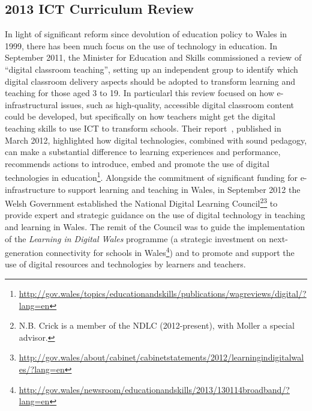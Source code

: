 \documentclass{sig-alternate}
\begin{document}
%

\subsection{2013 ICT Curriculum Review}


In light of significant reform since devolution of education policy to
Wales in 1999, there has been much focus on the use of technology in
education. In September 2011, the Minister for Education and Skills
commissioned a review of ``digital classroom teaching'', setting up an
independent group to identify which digital classroom delivery aspects
should be adopted to transform learning and teaching for those aged 3
to 19. In particularl this review focused on how e-infrastructural
issues, such as high-quality, accessible digital classroom content
could be developed, but specifically on how teachers might get the
digital teaching skills to use ICT to transform schools. Their
report~\cite{haywarddigwales:2012}, published in March 2012,
highlighted how digital technologies, combined with sound pedagogy,
can make a substantial difference to learning experiences and
performance, recommends actions to introduce, embed and promote the
use of digital technologies in
education\footnote{\url{http://gov.wales/topics/educationandskills/publications/wagreviews/digital/?lang=en}}. Alongside
the commitment of significant funding for e-infrastructure to support
learning and teaching in Wales, in September 2012 the Welsh Government
established the National Digital Learning Council\footnote{N.B. Crick
is a member of the NDLC (2012-present), with Moller a special
advisor.}\footnote{\url{http://gov.wales/about/cabinet/cabinetstatements/2012/learningindigitalwales/?lang=en}}
to provide expert and strategic guidance on the use of digital
technology in teaching and learning in Wales.  The remit of the
Council was to guide the implementation of the {\emph{Learning in
Digital Wales}} programme (a strategic investment on next-generation
connectivity for schools in
Wales\footnote{\url{http://gov.wales/newsroom/educationandskills/2013/130114broadband/?lang=en}})
and to promote and support the use of digital resources and
technologies by learners and teachers.
\end{document}

